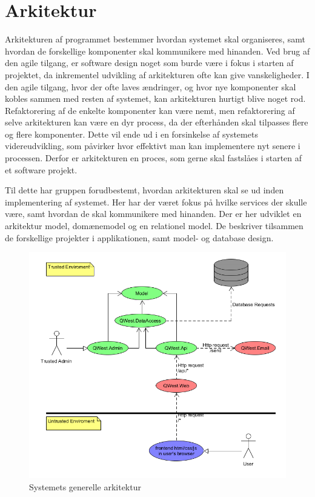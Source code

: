 \chapter{Arkitektur}\label{ch:Arkitektur}

Arkitekturen af programmet bestemmer hvordan systemet skal organiseres, samt hvordan de forskellige komponenter skal kommunikere med hinanden. Ved brug af den agile tilgang, er software design noget som burde være i fokus i starten af projektet, da inkrementel udvikling af arkitekturen ofte kan give vanskeligheder. I den agile tilgang, hvor der ofte laves ændringer, og hvor nye komponenter skal kobles sammen med resten af systemet, kan arkitekturen hurtigt blive noget rod. Refaktorering af de enkelte komponenter kan være nemt, men refaktorering af selve arkitekturen kan være en dyr process, da der efterhånden skal tilpasses flere og flere komponenter. Dette vil ende ud i en forsinkelse af systemets videreudvikling, som påvirker hvor effektivt man kan implementere nyt senere i processen. Derfor er arkitekturen en proces, som gerne skal fastslåes i starten af et software projekt. \cite{Sommerville}

Til dette har gruppen forudbestemt, hvordan arkitekturen skal se ud inden implementering af systemet. Her har der været fokus på hvilke services der skulle være, samt hvordan de skal kommunikere med hinanden. Der er her udviklet en arkitektur model, domænemodel og en relationel model. De beskriver tilsammen de forskellige projekter i applikationen, samt model- og database design. 

\begin{figure}[H]
    \includegraphics[width=\linewidth]{figures/Architecture.png}
    \caption{Systemets generelle arkitektur}
    \label{fig:Architecture}
\end{figure}

